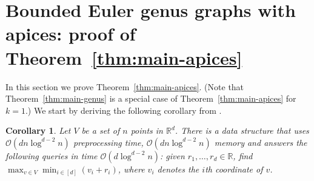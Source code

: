 \documentclass[11pt,a4paper]{article}
\newtheorem{corollary}[lemma]{Corollary}
\newcommand{\Oh}{\mathcal{O}}
\begin{document}
\section{Bounded Euler genus graphs with apices: proof of Theorem~\ref{thm:main-apices}}\label{sec:algo-genus}

In this section we prove Theorem~\ref{thm:main-apices}.
(Note that Theorem~\ref{thm:main-genus} is a special case of Theorem~\ref{thm:main-apices}
 for $k=1$.)
We start by deriving the following corollary from .

\begin{corollary}\label{l:max_min_query}
Let $V$ be a set of $n$ points in $\mathbb{R}^d$.
There is a data structure that uses $\Oh \left( d n \log^{d - 2} n \right)$ preprocessing time, $\Oh \left( d n \log^{d - 2} n \right)$ memory and answers the following queries in time $\Oh \left( d \log^{d - 2} n \right)$: given $r_1, \dots, r_d \in \mathbb{R}$, find $\max_{v \in V} \min_{i \in [d]} (v_i + r_i)$, where $v_i$ denotes the $i$th coordinate of $v$.
\end{corollary}
\end{document}
